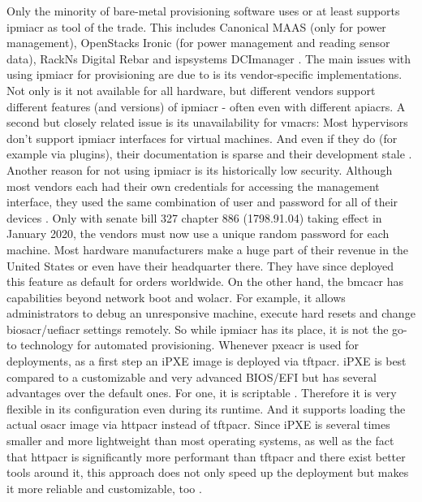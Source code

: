 \newline
Only the minority of bare-metal provisioning software uses or at least supports \gls{ipmiacr} as tool of the trade. This includes Canonical MAAS (only for power management), OpenStacks Ironic (for power management and reading sensor data), RackNs Digital Rebar and ispsystems DCImanager \cite{maas_snap_power_management} \cite{openstack_ironic_docs} \cite{rackn_what_is_digital_rebar} \cite{ispsystem_dcimanager}.
The main issues with using \gls{ipmiacr} for provisioning are due to is its vendor-specific implementations. Not only is it not available for all hardware, but different vendors support different features (and versions) of \gls{ipmiacr} - often even with different \gls{apiacr}s. A second but closely related issue is its unavailability for \gls{vmacr}s: Most hypervisors don't support \gls{ipmiacr} interfaces for virtual machines. And even if they do (for example via plugins), their documentation is sparse and their development stale \cite{openstack_virtualbmc}.
\newline
Another reason for not using \gls{ipmiacr} is its historically low security. Although most vendors each had their own credentials for accessing the management interface, they used the same combination of user and password for all of their devices \cite{bmc_default_passwords}. Only with senate bill 327 chapter 886 (1798.91.04) taking effect in January 2020, the vendors must now use a unique random password for each machine. Most hardware manufacturers make a huge part of their revenue in the United States or even have their headquarter there. They have since deployed this feature as default for orders worldwide.
\newline
On the other hand, the \gls{bmcacr} has capabilities beyond network boot and \gls{wolacr}. For example, it allows administrators to debug an unresponsive machine, execute hard resets and change \gls{biosacr}/\gls{uefiacr} settings remotely.
So while \gls{ipmiacr} has its place, it is not the go-to technology for automated provisioning.
\newline
Whenever \gls{pxeacr} is used for deployments, as a first step an iPXE image is deployed via \gls{tftpacr}. iPXE is best compared to a customizable and very advanced BIOS/EFI but has several advantages over the default ones. For one, it is scriptable \cite{ipxe_scripting}. Therefore it is very flexible in its configuration even during its runtime. And it supports loading the actual \gls{osacr} image via \gls{httpacr} instead of \gls{tftpacr}. Since iPXE is several times smaller and more lightweight than most operating systems, as well as the fact that \gls{httpacr} is significantly more performant than \gls{tftpacr} and there exist better tools around it, this approach does not only speed up the deployment but makes it more reliable and customizable, too \cite{ipxe_uefi_http} \cite{why_ipxe} \cite{foreman_ipxe} \cite{jpmens_network_boot_http}.
